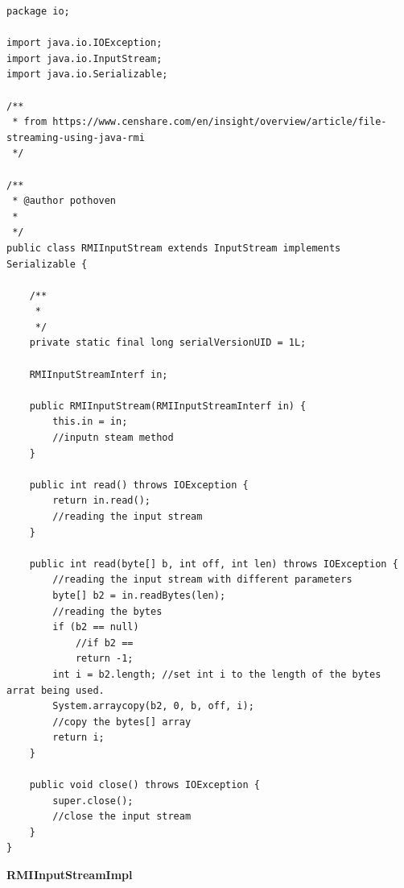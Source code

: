 \documentclass{article}
\begin{document}
\begin{lstlisting}
package io;

import java.io.IOException;
import java.io.InputStream;
import java.io.Serializable;

/**
 * from https://www.censhare.com/en/insight/overview/article/file-streaming-using-java-rmi
 */

/**
 * @author pothoven
 *
 */
public class RMIInputStream extends InputStream implements Serializable {

    /**
	 * 
	 */
	private static final long serialVersionUID = 1L;
	
	RMIInputStreamInterf in;
    
    public RMIInputStream(RMIInputStreamInterf in) {
        this.in = in;
        //inputn steam method
    }
    
    public int read() throws IOException {
        return in.read();
        //reading the input stream
    }

    public int read(byte[] b, int off, int len) throws IOException {
        //reading the input stream with different parameters
        byte[] b2 = in.readBytes(len);
        //reading the bytes
        if (b2 == null)
            //if b2 == 
            return -1;
        int i = b2.length; //set int i to the length of the bytes arrat being used. 
        System.arraycopy(b2, 0, b, off, i);
        //copy the bytes[] array
        return i;
    }
    
    public void close() throws IOException {
        super.close();
        //close the input stream
    }
}

\end{lstlisting}

\textbf{RMIInputStreamImpl}
\end{document}
